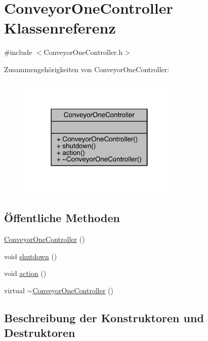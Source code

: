 \hypertarget{class_conveyor_one_controller}{}\section{Conveyor\+One\+Controller Klassenreferenz}
\label{class_conveyor_one_controller}


{\ttfamily \#include $<$Conveyor\+One\+Controller.\+h$>$}



Zusammengehörigkeiten von Conveyor\+One\+Controller\+:\nopagebreak
\begin{figure}[H]
\begin{center}
\leavevmode
\includegraphics[width=222pt]{class_conveyor_one_controller__coll__graph}
\end{center}
\end{figure}
\subsection*{Öffentliche Methoden}
\begin{DoxyCompactItemize}
\item 
\hyperlink{class_conveyor_one_controller_ab93770638de1fbf75612b8886b48ce83}{Conveyor\+One\+Controller} ()
\item 
void \hyperlink{class_conveyor_one_controller_a837b5b29b5933795413a50446abd9861}{shutdown} ()
\item 
void \hyperlink{class_conveyor_one_controller_a4afc5302a370ec6b1d19514df56ce64c}{action} ()
\item 
virtual \hyperlink{class_conveyor_one_controller_a7e284560fd1dd2b55b38418b3b7e9e16}{$\sim$\+Conveyor\+One\+Controller} ()
\end{DoxyCompactItemize}


\subsection{Beschreibung der Konstruktoren und Destruktoren}
\hypertarget{class_conveyor_one_controller_ab93770638de1fbf75612b8886b48ce83}{}\label{class_conveyor_one_controller_ab93770638de1fbf75612b8886b48ce83} 
